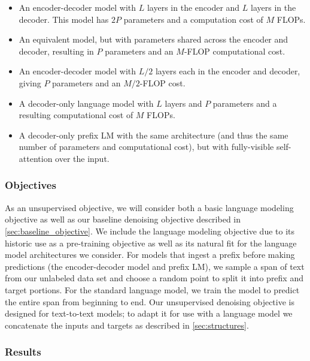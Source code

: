 \begin{itemize}
    \item An encoder-decoder model with $L$ layers in the encoder and $L$ layers in the decoder. This model has $2P$ parameters and a computation cost of $M$ FLOPs.
    \item An equivalent model, but with parameters shared across the encoder and decoder, resulting in $P$ parameters and an $M$-FLOP computational cost.
    \item An encoder-decoder model with $L/2$ layers each in the encoder and decoder, giving $P$ parameters and an $M/2$-FLOP cost.
    \item A decoder-only language model with $L$ layers and $P$ parameters and a resulting computational cost of $M$ FLOPs.
    \item A decoder-only prefix LM with the same architecture (and thus the same number of parameters and computational cost), but with fully-visible self-attention over the input.
\end{itemize}

\subsubsection{Objectives}
\label{sec:architecture_objectives}

As an unsupervised objective, we will consider both a basic language modeling objective as well as our baseline denoising objective described in \ref{sec:baseline_objective}.
We include the language modeling objective due to its historic use as a pre-training objective \citep{dai2015semi,ramachandran2016unsupervised,howard2018universal,radford2018improving,peters2018deep} as well as its natural fit for the language model architectures we consider. For models that ingest a prefix before making predictions (the encoder-decoder model and prefix LM), we sample a span of text from our unlabeled data set and choose a random point to split it into prefix and target portions. For the standard language model, we train the model to predict the entire span from beginning to end. Our unsupervised denoising objective is designed for text-to-text models; to adapt it for use with a language model we concatenate the inputs and targets as described in \ref{sec:structures}.

\subsubsection{Results}

